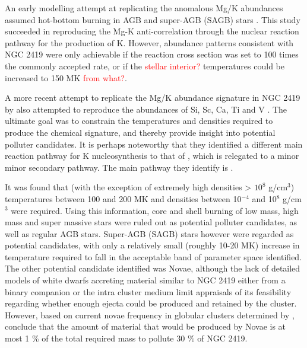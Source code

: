 \documentclass[a4paper,fleqn,usenatbib]{mnras}
\newcommand{\todo}[1]{\textcolor{red}{#1}}
\begin{document}
An early modelling attempt at replicating the anomalous Mg/K abundances assumed hot-bottom burning in AGB and super-AGB (SAGB) stars \citep{ventura2012}. This study succeeded in reproducing the Mg-K anti-correlation through the nuclear reaction pathway  \citep{iliadis2016} for the production of K. However, abundance patterns consistent with NGC 2419 were only achievable if the reaction cross section was set to 100 times the commonly accepted rate, or if the \todo{stellar interior?} temperatures could be increased to 150 MK \todo{from what?}.


A more recent attempt to replicate the Mg/K abundance signature in NGC 2419 by \cite{iliadis2016} also attempted to reproduce the abundances of Si, Sc, Ca, Ti and V  \citep[elements reported as having weak correlations with Mg by][]{cohenkirby2012}. The ultimate goal was to constrain the temperatures and densities required to produce the chemical signature, and thereby provide insight into potential polluter candidates. It is perhaps noteworthy that they identified a different main reaction pathway for K nucleosynthesis to that of \cite{ventura2012}, which is relegated to a minor minor secondary pathway. The main pathway they identify is . 


It was found that (with the exception of extremely high densities > $10^8$ g/cm$^3$) temperatures between 100 and 200 MK and densities between 10$^{-4}$ and 10$^8$ g/cm$^3$ were required. Using this information, core and shell burning of low mass, high mass and super massive stars were ruled out as potential polluter candidates, as well as regular AGB stars. Super-AGB (SAGB) stars however were regarded as potential candidates, with only a relatively small (roughly 10-20 MK) increase in temperature required to fall in the acceptable band of parameter space identified. The other potential candidate identified was Novae, although the lack of detailed models of white dwarfs accreting material similar to NGC 2419 either from a binary companion or the intra cluster medium limit appraisals of its feasibility regarding whether enough ejecta could be produced and retained by the cluster. However, based on current novae frequency in globular clusters determined by \cite{kato2013novae}, \cite{iliadis2016} conclude that the amount of material that would be produced by Novae is at most 1 \% of the total required mass to pollute 30 \% of NGC 2419.
\end{document}
